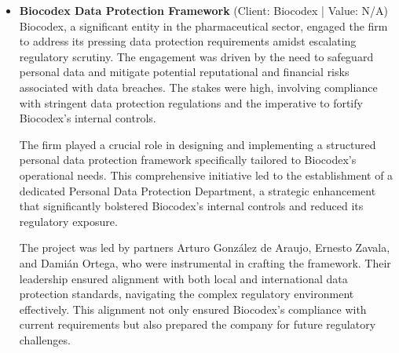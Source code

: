 \documentclass[11pt]{article}
\begin{document}
\begin{itemize}
The firm played a critical role in representing MEGA DIRECT in numerous legal proceedings, focusing on safeguarding the client's data management practices against potential legal challenges. This representation involved detailed oversight and strategic legal interventions to ensure compliance with evolving data protection laws and regulations, thereby strengthening the client's compliance posture. 

The advisory team was led by Arturo González de Araujo, Ernesto Zavala, and Damián Ortega, each bringing their specialized expertise to tackle the multifaceted legal challenges faced by MEGA DIRECT. Their leadership was pivotal in developing tailored legal strategies that not only mitigated risks but also enhanced the client's data governance capabilities.

This matter underscores the firm's ability to provide long-term, high-level legal support in the realm of data protection, reinforcing its status as a trusted advisor in the field. The firm's adeptness at adapting to regulatory changes and delivering proactive solutions has been instrumental in maintaining MEGA DIRECT's competitive advantage in the market.
\item \textbf{Biocodex Data Protection Framework} (Client: Biocodex | Value: N/A)\\ Biocodex, a significant entity in the pharmaceutical sector, engaged the firm to address its pressing data protection requirements amidst escalating regulatory scrutiny. The engagement was driven by the need to safeguard personal data and mitigate potential reputational and financial risks associated with data breaches. The stakes were high, involving compliance with stringent data protection regulations and the imperative to fortify Biocodex's internal controls.

The firm played a crucial role in designing and implementing a structured personal data protection framework specifically tailored to Biocodex's operational needs. This comprehensive initiative led to the establishment of a dedicated Personal Data Protection Department, a strategic enhancement that significantly bolstered Biocodex's internal controls and reduced its regulatory exposure.

The project was led by partners Arturo González de Araujo, Ernesto Zavala, and Damián Ortega, who were instrumental in crafting the framework. Their leadership ensured alignment with both local and international data protection standards, navigating the complex regulatory environment effectively. This alignment not only ensured Biocodex's compliance with current requirements but also prepared the company for future regulatory challenges.


\end{itemize}
\end{document}
